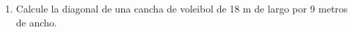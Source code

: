 \documentclass[fleqn]{article}
\begin{document}
\begin{enumerate}
\begin{enumerate}
 \end{enumerate}
 \item Calcule la diagonal de una cancha de voleibol de 18 m de largo por 9 metros de ancho.\noanswer

 \end{enumerate}
\end{document}
